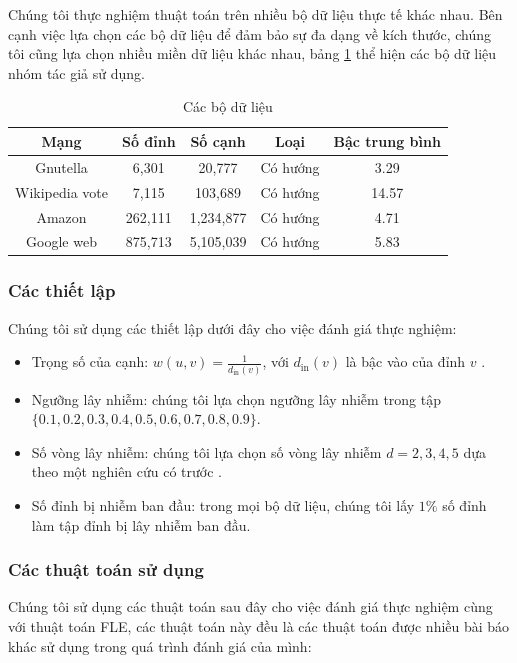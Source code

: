 Chúng tôi thực nghiệm thuật toán trên nhiều bộ dữ liệu thực tế khác nhau. Bên cạnh việc lựa chọn các bộ dữ liệu để đảm bảo sự đa dạng về kích thước, chúng tôi cũng lựa chọn nhiều miền dữ liệu khác nhau, bảng \ref{tab:Table1} thể hiện các bộ dữ liệu nhóm tác giả sử dụng.
\begin{table}
	\centering
	\begin{tabular}{|c|c|c|c|c|}
		\hline 
		Mạng & Số đỉnh & Số cạnh & Loại & Bậc trung bình \\ 
		\hline 
		Gnutella & 6,301 & 20,777 & Có hướng & 3.29 \\ 
		\hline 
		Wikipedia vote & 7,115 & 103,689 & Có hướng & 14.57 \\ 
		\hline 
		Amazon & 262,111 & 1,234,877 & Có hướng & 4.71 \\ 
		\hline 
		Google web & 875,713 & 5,105,039 & Có hướng & 5.83 \\ 
		\hline 
	\end{tabular} 
	\caption{Các bộ dữ liệu}
	\label{tab:Table1}
\end{table}

\subsubsection{Các thiết lập}
Chúng tôi sử dụng các thiết lập dưới đây cho việc đánh giá thực nghiệm:

\begin{itemize}
	\item Trọng số của cạnh: $w(u,v)=\frac{1}{d_{\text{in}}(v)}$, với $d_{\text{in}}(v)$ là bậc vào của đỉnh $v$ \cite{kemple1} \cite{chen10LT} \cite{khali} \cite{amit21}.
	\item Ngưỡng lây nhiễm: chúng tôi lựa chọn ngưỡng lây nhiễm trong tập \\ $\{0.1, 0.2, 0.3, 0.4, 0.5, 0.6, 0.7, 0.8, 0.9\}$.
	\item Số vòng lây nhiễm: chúng tôi lựa chọn số vòng lây nhiễm $d = 2, 3, 4, 5$ dựa theo một nghiên cứu có trước \cite{cha23}.
	\item Số đỉnh bị nhiễm ban đầu: trong mọi bộ dữ liệu, chúng tôi lấy $1\%$ số đỉnh làm tập đỉnh bị lây nhiễm ban đầu. 
\end{itemize}

\subsubsection{Các thuật toán sử dụng}
Chúng tôi sử dụng các thuật toán sau đây cho việc đánh giá thực nghiệm cùng với thuật toán FLE, các thuật toán này đều là các thuật toán được nhiều bài báo khác sử dụng trong quá trình đánh giá của mình:

